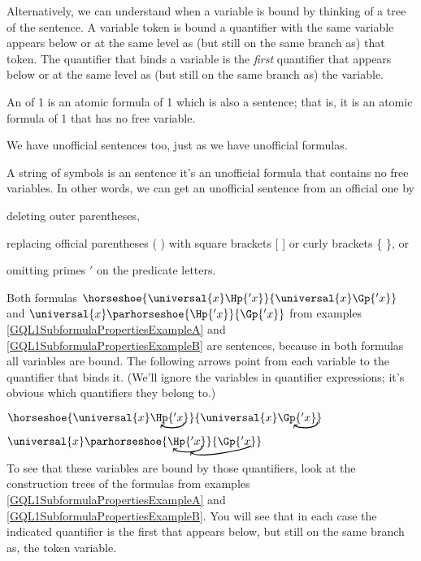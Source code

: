 Alternatively, we can understand when a variable is bound by thinking of a tree of the sentence. A variable token is bound \Iff a quantifier with the same variable appears below or at the same level as (but still on the same branch as) that token. 
The quantifier that binds a variable is the \emph{first} quantifier that appears below or at the same level as (but still on the same branch as) the variable. 
\begin{majorILnc}{}
An   of \GQL{}1 is an atomic formula of \GQL{}1 which is also a sentence; that is, it is an atomic formula of \GQL{}1 that has no free variable.
\end{majorILnc}
\noindent{}We have unofficial sentences too, just as we have unofficial formulas.
\begin{majorILnc}{}
A string of symbols is an  sentence \Iff it's an unofficial formula that contains no free variables. In other words, we can get an unofficial sentence from an official one by
\begin{cenumerate}
\item deleting outer parentheses,
\item replacing official parentheses ( ) with square brackets [ ] or curly brackets \{ \}, or
\item omitting primes $'$ on the predicate letters.
\end{cenumerate}
\end{majorILnc}
\begin{majorILnc}{}
Both formulas $\horseshoe{\universal{\variable{x}}\Hp{'\variable{x}}}{\universal{\variable{x}}\Gp{'\variable{x}}}$ and $\universal{\variable{x}}\parhorseshoe{\Hp{'\variable{x}}}{\Gp{'\variable{x}}}$ from examples \ref{GQL1SubformulaPropertiesExampleA} and \ref{GQL1SubformulaPropertiesExampleB} are sentences, because in both formulas all variables are bound.
The following arrows point from each variable to the quantifier that binds it.  (We'll ignore the variables in quantifier expressions; it's obvious which quantifiers they belong to.)
\begin{cenumerate}
\item $\horseshoe{\universal{\variable{x}}\Hp{'\variable{x}}\NextLineRef[black, distance=6, out=-70, in=-50]}{\universal{\variable{x}}\Gp{'\variable{x}}}\NextLineRef[black, distance=6, out=-70, in=-50]$
\item $\universal{\variable{x}}\parhorseshoe{\Hp{'\variable{x}}\NextLineRefJ[black, out=-50, in=-50]}{\Gp{'\variable{x}}\NextLineRefB[black, distance=9, out=205, in=315]}$
\end{cenumerate}

\medskip
\noindent{}To see that these variables are bound by those quantifiers, look at the construction trees of the formulas from examples \ref{GQL1SubformulaPropertiesExampleA} and \ref{GQL1SubformulaPropertiesExampleB}. You will see that in each case the indicated quantifier is the first that appears below, but still on the same branch as, the token variable.
\end{majorILnc}

